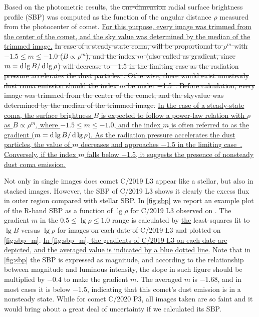 Based on the photometric results, the \st{one-dimension} radial surface brightness profile (SBP) was computed as the function of the angular distance $\rho$ measured from the photocenter of comet. \ul{For this purpose, every image was trimmed from the center of the comet, and the sky value was determined by the median of the trimmed image.} 
\st{In case of a steady-state coma, will be proportional to $\rho^m$ with $-1.5 \leqslant m \leqslant -1.0$ ($B \propto \rho^m$), and the index $m$ (also called as gradient, since $m=\mathop{}\!\mathrm{d}\lg{B} / \mathop{}\!\mathrm{d}\lg{\rho}$) will decrease to \si{\num{-1.5}} in the limiting case as the radiation pressure accelerates the dust particles~\citep{jewitt_surface_1987}. Otherwise, 
there would exist nonsteady dust coma emission should the index $m$ be under \si{\num{-1.5}}~\citep{lowry_ccd_1999}. 
Before calculation, every image was trimmed from the center of the comet, and the skyvalue was determined by the median of the trimmed image.} 
\ul{In the case of a steady-state coma, the surface brightness $B$ is expected to follow a power-law relation with $\rho$ as $B \propto \rho^m$, where $-1.5 \leqslant m \leqslant -1.0$, and the index $m$ is often referred to as the gradient ($m=\mathop{}\!\mathrm{d}\lg{B} / \mathop{}\!\mathrm{d}\lg{\rho}$). As the radiation pressure accelerates the dust particles, the value of $m$ decreases and approaches \si{\num{-1.5}} in the limiting case~\citep{jewitt_surface_1987}. Conversely, if the index $m$ falls below \si{\num{-1.5}}, it suggests the presence of nonsteady dust coma emission.}

Not only in single images does comet C/2019 L3 appear like a stellar, but also in stacked images. However, the SBP of C/2019 L3 shows it clearly the excess flux in outer region compared with stellar SBP. In \autoref{fig:sbp} we report an example plot of the R-band SBP as a function of $\lg{\rho}$ for C/2019 L3 observed on . The gradient $m$ in the $0.5 \leqslant \lg{\rho} \leqslant 1.0$ range is calculated by \ul{the} least-squares fit to $\lg{B}$ versus $\lg{\rho}$\st{ for images on each date of C/2019 L3 and plotted on \autoref{fig:sbp_m}.} 
\ul{In \autoref{fig:sbp_m}, the gradients of C/2019 L3 on each date are depicted, and the averaged value is indicated by a blue dotted line.} 
Note that in \autoref{fig:sbp} the SBP is expressed as magnitude, and according to the relationship between magnitude and luminous intensity, the slope in such figure should be multiplied by \num{-0.4} to make the gradient $m$. The averaged $m$ is \si{\num{-1.68}}, and in most cases it is below \si{\num{-1.5}}, indicating that this comet's dust emission is in a nonsteady state. While for comet C/2020 P3, all images taken are so faint and it would bring about a great deal of uncertainty if we calculated its SBP. 

